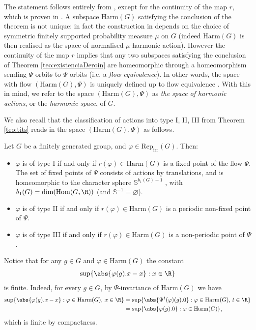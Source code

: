 \documentclass[reqno]{amsart}
\begin{document}
The statement follows entirely from \cite[Theorem 8.5]{DKNP}, except for the continuity of the map $r$, which is proven in \cite[Section 14.2]{BMRT}. A subspace $\mathrm{Harm}(G)$ satisfying the conclusion of the theorem is not unique: in fact the construction in \cite{DKNP} depends on the choice of symmetric finitely supported probability measure $\mu$ on $G$ (indeed  $\mathrm{Harm}(G)$ is then realised as the space of normalised $\mu$-harmonic action). However the continuity of the map $r$ implies that any two subspaces satisfying the conclusion of Theorem \ref{teo:existenciaDeroin} are homeomorphic through a homeomorphism sending $\Psi$-orbits to $\Psi$-orbits (i.e. a \emph{flow equivalence}). In other words, the space with flow $(\mathrm{Harm}(G), \Psi)$ is uniquely defined up to flow equivalence \cite[Theorem 3.7]{BMRTrealisation}. With this in mind, we refer to the space $(\mathrm{Harm}(G), \Psi)$ as \emph{the space of harmonic actions}, or the \emph{harmonic space}, of $G$.


We also recall  that the classification of actions into type I, II, III from Theorem \ref{teo:tits} reads in the space $(\mathrm{Harm}(G), \Psi)$ as follows. 


\begin{prop}
Let $G$ be a finitely generated group, and $\varphi\in\mathrm{Rep}_\mathrm{irr}(G)$. Then:
\begin{itemize}
    \item $\varphi$ is of type I if and only if $r(\varphi)
    \in \mathrm{Harm}(G)$ is a fixed point of the flow $\Psi$. The set of fixed points of $\Psi$ consists of actions by translations, and is homeomorphic to the character sphere $\mathbb{S}^{b_1(G)-1}$ , with  $b_1(G)=\dim(\mathrm{Hom}(G, \R))$   (and $\mathbb{S}^{-1} = \varnothing$).
    
    \item $\varphi$ is of type II if and only if $r(\varphi)\in \mathrm{Harm}(G)$ is a periodic non-fixed point of $\Psi$. 
    
    \item $\varphi$ is of type III if and only if $r(\varphi)\in \mathrm{Harm}(G)$ is a non-periodic point of $\Psi$.
    
    
    
\end{itemize}

\end{prop}

\begin{rmk} \label{rem:bounded-displacement}
Notice that for any $g \in G$ and $\varphi \in \mathrm{Harm}(G)$ the constant
\[
    \sup\{\abs{\varphi(g).x - x} : x \in \R\}
\]
is finite. Indeed, for every $g \in G$, by $\Psi$-invariance of $\mathrm{Harm}(G)$ we have
 \begin{align*}
 	\sup\{\abs{\varphi(g).x - x} : \varphi \in \mathrm{Harm}(G), \, x \in \R\} &= \sup\{\abs{\Psi^t(\varphi)(g).0} : \varphi \in \mathrm{Harm}(G),\, t \in \R\} \\
 		& = \sup\{\abs{\varphi(g).0} : \varphi \in \mathrm{Harm}(G)\},
\end{align*}
which is finite by compactness.
\end{rmk}
\end{document}
